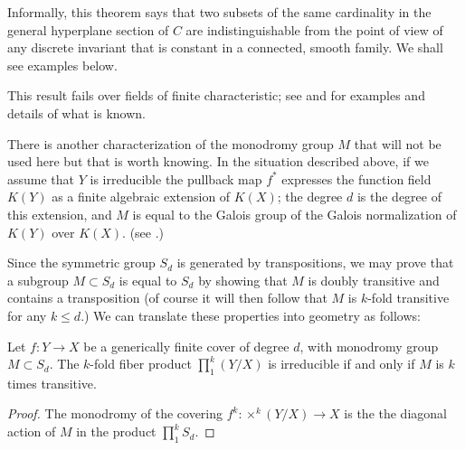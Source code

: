Informally, this theorem says that two subsets of the same cardinality in the general hyperplane section of $C$
are indistinguishable from the point of view of any discrete invariant that is constant in
a connected, smooth family. We shall see examples below.

This result fails over fields of finite characteristic; see \cite{Rathmann} and \cite{Kadets} for examples and details of what is known. 

\begin{fact}
There is another characterization of the monodromy group $M$ that will not be used here but that is worth knowing. In the situation described above, if we assume that $Y$ is irreducible the pullback map $f^*$ expresses the function field $K(Y)$ as a finite algebraic extension of $K(X)$; the degree $d$ is the degree of this extension, and $M$ is equal to the Galois group of the Galois normalization of $K(Y)$ over $K(X)$. (see \cite{Harris1979}.)
\end{fact}

Since the symmetric group $S_d$ is generated by transpositions, we may prove that a subgroup $M\subset S_d$ is equal to $S_d$ by showing that $M$ is doubly transitive and contains a transposition (of course it will then follow that $M$ is $k$-fold transitive for any $k\leq d$.) We can translate these properties into geometry as follows:

\begin{lemma}\label{transitivity lemma}
Let $f : Y \to X$ be a generically finite cover of degree $d$, with  monodromy group $M \subset S_d$.
The $k$-fold fiber product $\prod_1^k(Y/X)$ is irreducible if and only if $M$ is $k$ times transitive.
\end{lemma}

\begin{proof}
The monodromy of the covering $f^k: \times^k(Y/X) \to X$ is the the diagonal action of
$M$ in the product $\prod_1^k S_d$.
\end{proof}


